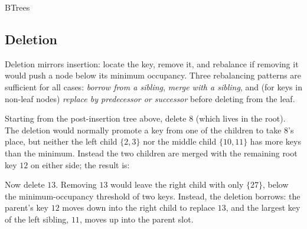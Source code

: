 \documentclass[hidelinks]{article}
\begin{document}
\begin{smodule}[title={B-Trees}]{BTrees}
\subsection{Deletion}

Deletion mirrors insertion: locate the key, remove it, and rebalance if removing it would push a node below its minimum occupancy. Three rebalancing patterns are sufficient for all cases: \emph{borrow from a sibling}, \emph{merge with a sibling}, and (for keys in non-leaf nodes) \emph{replace by predecessor or successor} before deleting from the leaf.

\begin{example}
Starting from the post-insertion tree above, delete $8$ (which lives in the root). The deletion would normally promote a key from one of the children to take $8$'s place, but neither the left child $\{2,3\}$ nor the middle child $\{10,11\}$ has more keys than the minimum. Instead the two children are merged with the remaining root key $12$ on either side; the result is:
\begin{center}
\end{center}
\end{example}

\begin{example}
Now delete $13$. Removing $13$ would leave the right child with only $\{27\}$, below the minimum-occupancy threshold of two keys. Instead, the deletion borrows: the parent's key $12$ moves down into the right child to replace $13$, and the largest key of the left sibling, $11$, moves up into the parent slot.
\begin{center}
\end{center}
\end{example}


\end{smodule}
\end{document}
